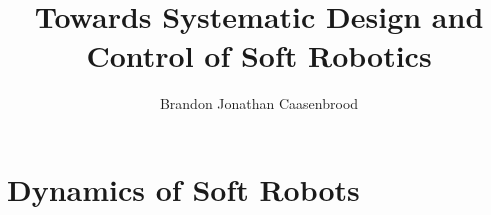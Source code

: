 \documentclass[12pt]{phd}
\title{Towards Systematic Design and Control of Soft Robotics}
\author{Brandon Jonathan Caasenbrood}
\begin{document}
\maketitle
%

\chapter{Dynamics of Soft Robots}
\label{ch:2-dynamics} 




\appendix
%


\end{document}
